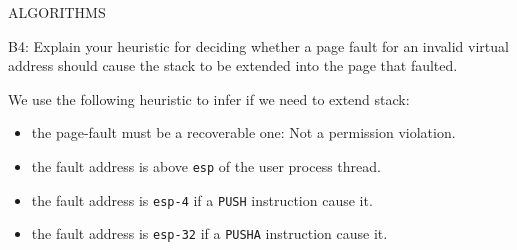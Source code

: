 \begin{aspect}{ALGORITHMS}
	\begin{qc}
		B4: Explain your heuristic for deciding whether a page fault for an invalid virtual address
		should cause the stack to be extended into the page that faulted.
	\end{qc}
	We use the following heuristic to infer if we need to extend stack:
	\begin{itemize}
		\item the page-fault must be a recoverable one: Not a permission violation.
		\item the fault address is above \lstinline{esp} of the user process thread.
		\item the fault address is \lstinline{esp-4} if a \lstinline{PUSH} instruction cause it.
		\item the fault address is \lstinline{esp-32} if a \lstinline{PUSHA} instruction cause it.
	\end{itemize}

\end{aspect}

